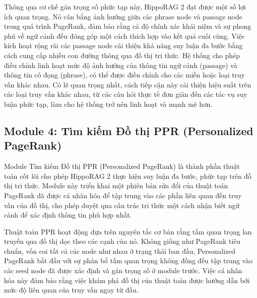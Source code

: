 \documentclass[../main.tex]{subfiles}
\begin{document}

Thông qua cơ chế gán trọng số phức tạp này, HippoRAG 2 đạt được một số lợi ích quan trọng. Nó cân bằng ảnh hưởng giữa các phrase node và passage node trong quá trình PageRank, đảm bảo rằng cả độ chính xác khái niệm và sự phong phú về ngữ cảnh đều đóng góp một cách thích hợp vào kết quả cuối cùng. Việc kích hoạt rộng rãi các passage node cải thiện khả năng suy luận đa bước bằng cách cung cấp nhiều con đường thông qua đồ thị tri thức. Hệ thống cho phép điều chỉnh linh hoạt mức độ ảnh hưởng của thông tin ngữ cảnh (passage) và thông tin cô đọng (phrase), có thể được điều chỉnh cho các miền hoặc loại truy vấn khác nhau. Có lẽ quan trọng nhất, cách tiếp cận này cải thiện hiệu suất trên các loại truy vấn khác nhau, từ các câu hỏi thực tế đơn giản đến các tác vụ suy luận phức tạp, làm cho hệ thống trở nên linh hoạt và mạnh mẽ hơn.

\subsection{Module 4: Tìm kiếm Đồ thị PPR (Personalized PageRank)}
Module Tìm kiếm Đồ thị PPR (Personalized PageRank) là thành phần thuật toán cốt lõi cho phép HippoRAG 2 thực hiện suy luận đa bước, phức tạp trên đồ thị tri thức. Module này triển khai một phiên bản sửa đổi của thuật toán PageRank đã được cá nhân hóa để tập trung vào các phần liên quan đến truy vấn của đồ thị, cho phép duyệt qua cấu trúc tri thức một cách nhận biết ngữ cảnh để xác định thông tin phù hợp nhất.

Thuật toán PPR hoạt động dựa trên nguyên tắc cơ bản rằng tầm quan trọng lan truyền qua đồ thị dọc theo các cạnh của nó. Không giống như PageRank tiêu chuẩn, vốn coi tất cả các node như nhau ở trạng thái ban đầu, Personalized PageRank bắt đầu với sự phân bổ tầm quan trọng không đồng đều tập trung vào các seed node đã được xác định và gán trọng số ở module trước. Việc cá nhân hóa này đảm bảo rằng việc khám phá đồ thị của thuật toán được hướng dẫn bởi mức độ liên quan của truy vấn ngay từ đầu.
\end{document}
